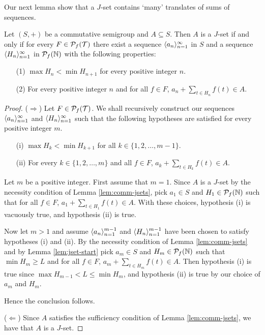 Our next lemma show that a $J$-set contains `many' translates of sums of sequences. 
\begin{lem}
  \label{lem:comm-many}
  Let $(S, +)$ be a commutative semigroup and $A \subseteq S$.
  Then $A$ is a $J$-set if and only if for every $F \in \mathcal{P}_f(\mathcal{T})$ there exist a sequence $\langle a_n \rangle_{n=1}^\infty$ in $S$ and a sequence $\langle H_n \rangle_{n=1}^\infty$ in $\mathcal{P}_f(\mathbb{N})$ with the following properties:
  \begin{itemize}
    \item[(1)]
      $\max H_n < \min H_{n+1}$ for every positive integer $n$.

    \item[(2)]
      For every positive integer $n$ and for all $f \in F$, $a_n + \sum_{t \in H_n} f(t) \in A$. 
  \end{itemize}
\end{lem}
\begin{proof}
  ($\Rightarrow$)
  Let $F \in \mathcal{P}_f(\mathcal{T})$.
  We shall recursively construct our sequences $\langle a_n \rangle_{n=1}^\infty$ and $\langle H_n \rangle_{n=1}^\infty$ such that the following hypotheses are satisfied for every positive integer $m$. 
  \begin{itemize}
    \item[(i)]
      $\max H_k < \min H_{k+1}$ for all $k \in \{1, 2, \ldots, m-1\}$.

    \item[(ii)]
      For every $k \in \{1, 2, \ldots, m\}$ and all $f \in F$, $a_k + \sum_{t \in H_k} f(t) \in A$.
  \end{itemize}

  Let $m$ be a positive integer.
  First assume that $m = 1$. 
  Since $A$ is a $J$-set by the necessity condition of Lemma \ref{lem:comm-jsets}, pick $a_1 \in S$ and $H_1 \in \mathcal{P}_f(\mathbb{N})$ such that for all $f \in F$, $ a_1 + \sum_{t \in H_1} f(t)\in A$. 
  With these choices, hypothesis (i) is vacuously true, and hypothesis (ii) is true.

  Now let $m > 1$ and assume $\langle a_n \rangle_{n=1}^{m-1}$ and $\langle H_n \rangle_{n=1}^{m-1}$ have been chosen to satisfy hypotheses (i) and (ii).
  By the necessity condition of Lemma \ref{lem:comm-jsets} and by Lemma \ref{lem:jset-start} pick $a_m \in S$ and $H_m \in \mathcal{P}_f(\mathbb{N})$ such that $\min H_m \ge L$ and for all $f \in F$, $a_m + \sum_{t \in H_m} f(t) \in A$. 
  Then hypothesis (i) is true since $\max H_{m-1} < L \le \min H_m$, and hypothesis (ii) is true by our choice of $a_m$ and $H_m$. 

  Hence the conclusion follows.

  ($\Leftarrow$)
  Since $A$ satisfies the sufficiency condition of Lemma \ref{lem:comm-jsets}, we have that $A$ is a $J$-set.
\end{proof}


